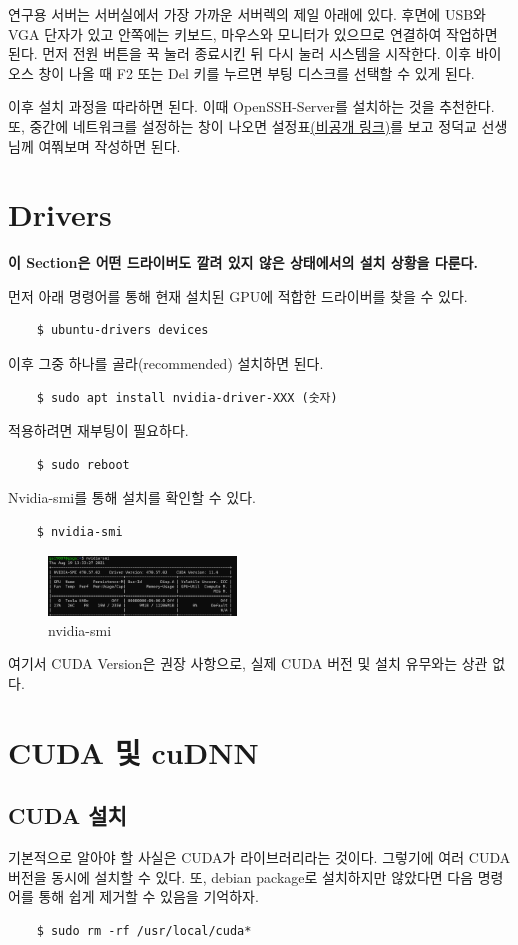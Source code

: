 연구용 서버는 서버실에서 가장 가까운 서버렉의 제일 아래에 있다. 후면에 USB와 VGA 단자가 있고 안쪽에는 키보드, 마우스와 모니터가 있으므로 연결하여 작업하면 된다. 먼저 전원 버튼을 꾹 눌러 종료시킨 뒤 다시 눌러 시스템을 시작한다. 이후 바이오스 창이 나올 때 F2 또는 Del 키를 누르면 부팅 디스크를 선택할 수 있게 된다.

이후 설치 과정을 따라하면 된다. 이때 OpenSSH-Server를 설치하는 것을 추천한다. 또, 중간에 네트워크를 설정하는 창이 나오면 설정표\href{https://github.com/gshslinuxintro/Server-Configuration/blob/main/Network.md}{(비공개 링크)}를 보고 정덕교 선생님께 여쭤보며 작성하면 된다.
\section{Drivers}
\textbf{이 Section은 어떤 드라이버도 깔려 있지 않은 상태에서의 설치 상황을 다룬다.}

먼저 아래 명령어를 통해 현재 설치된 GPU에 적합한 드라이버를 찾을 수 있다.
\begin{lstlisting}
    $ ubuntu-drivers devices
\end{lstlisting}
이후 그중 하나를 골라(recommended) 설치하면 된다.
\begin{lstlisting}
    $ sudo apt install nvidia-driver-XXX (숫자)
\end{lstlisting}
적용하려면 재부팅이 필요하다.
\begin{lstlisting}
    $ sudo reboot
\end{lstlisting}
Nvidia-smi를 통해 설치를 확인할 수 있다.
\begin{lstlisting}
    $ nvidia-smi
\end{lstlisting}
\begin{figure}[H]
	\begin{center}
        \includegraphics[width=5cm]{nvidia-smi}
        \caption{nvidia-smi}
    \end{center}
\end{figure}
여기서 CUDA Version은 권장 사항으로, 실제 CUDA 버전 및 설치 유무와는 상관 없다.


\section{CUDA 및 cuDNN}
\subsection{CUDA 설치}
기본적으로 알아야 할 사실은 CUDA가 라이브러리라는 것이다. 그렇기에 여러 CUDA 버전을 동시에 설치할 수 있다. 또, debian package로 설치하지만 않았다면 다음 명령어를 통해 쉽게 제거할 수 있음을 기억하자.
\begin{lstlisting}
    $ sudo rm -rf /usr/local/cuda*
\end{lstlisting}

